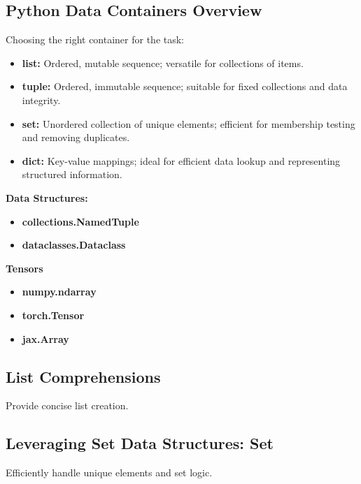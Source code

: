 \subsection{Python Data Containers Overview}
\begin{definition}
    Choosing the right container for the task:
    \begin{itemize}
        \item \textbf{list:} Ordered, mutable sequence; versatile for collections of items.
        \item \textbf{tuple:} Ordered, immutable sequence; suitable for fixed collections and data integrity.
        \item \textbf{set:} Unordered collection of unique elements; efficient for membership testing and removing duplicates.
        \item \textbf{dict:} Key-value mappings; ideal for efficient data lookup and representing structured information.
    \end{itemize}
    \vspace{1em}
    
    \textbf{Data Structures:}
    \begin{itemize}
        \item \textbf{collections.NamedTuple}
        \item \textbf{dataclasses.Dataclass}
    \end{itemize}
    \vspace{1em}

    \textbf{Tensors}
    \begin{itemize}
        \item \textbf{numpy.ndarray}
        \item \textbf{torch.Tensor}
        \item \textbf{jax.Array}
    \end{itemize}
\end{definition}

\subsection{List Comprehensions}
\begin{notes}
    Provide concise list creation.
\end{notes}

\subsection{Leveraging Set Data Structures: Set}
\begin{notes}
    Efficiently handle unique elements and set logic.
\end{notes}

